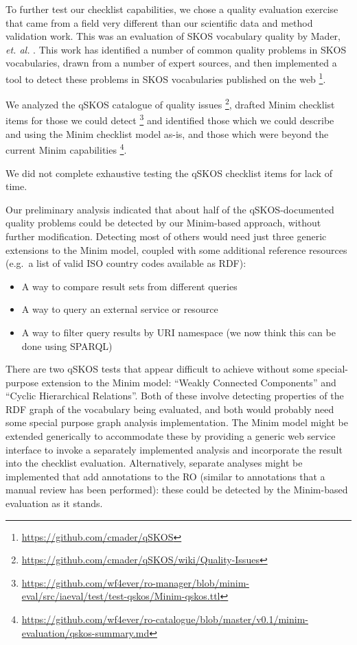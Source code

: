 To further test our checklist capabilities, we chose a quality
evaluation exercise that came from a field very different than our
scientific data and method validation work. This was an evaluation of
SKOS vocabulary quality by Mader, \emph{et. al.} \cite{Mader-2012}. This
work has identified a number of common quality problems in SKOS
vocabularies, drawn from a number of expert sources, and then
implemented a tool to detect these problems in SKOS vocabularies
published on the web \footnote{\url{https://github.com/cmader/qSKOS}}.

We analyzed the qSKOS catalogue of quality issues \footnote{\url{https://github.com/cmader/qSKOS/wiki/Quality-Issues}},
drafted Minim checklist items for those we could detect \footnote{\url{https://github.com/wf4ever/ro-manager/blob/minim-eval/src/iaeval/test/test-qskos/Minim-qskos.ttl}}
and identified those which we could describe and using the Minim
checklist model as-is, and those which were beyond the current Minim
capabilities \footnote{\url{https://github.com/wf4ever/ro-catalogue/blob/master/v0.1/minim-evaluation/qskos-summary.md}}.

We did not complete exhaustive testing the qSKOS checklist items for
lack of time.

Our preliminary analysis indicated that about half of the
qSKOS-documented quality problems could be detected by our Minim-based
approach, without further modification. Detecting most of others would
need just three generic extensions to the Minim model, coupled with some
additional reference resources (e.g.~a list of valid ISO country codes
available as RDF):

\begin{itemize}
\itemsep1pt\parskip0pt
\item
  A way to compare result sets from different queries
\item
  A way to query an external service or resource
\item
  A way to filter query results by URI namespace (we now think this can
  be done using SPARQL)
\end{itemize}

There are two qSKOS tests that appear difficult to achieve without some
special-purpose extension to the Minim model: ``Weakly Connected
Components'' and ``Cyclic Hierarchical Relations''. Both of these
involve detecting properties of the RDF graph of the vocabulary being
evaluated, and both would probably need some special purpose graph
analysis implementation. The Minim model might be extended generically
to accommodate these by providing a generic web service interface to
invoke a separately implemented analysis and incorporate the result into
the checklist evaluation. Alternatively, separate analyses might be
implemented that add annotations to the RO (similar to annotations that
a manual review has been performed): these could be detected by the
Minim-based evaluation as it stands.

